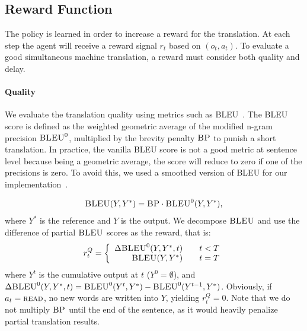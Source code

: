 

\subsection{Reward Function}
\label{sec:reward}

The policy is learned in order to increase a reward for the translation. At each step the agent will receive a reward signal $r_t$ based on $(o_t, a_t)$. To evaluate a good simultaneous machine translation, a reward must consider both quality and delay. 

\paragraph{Quality} We evaluate the translation quality using metrics such as BLEU~\cite{papineni2002bleu}. The BLEU score is defined as the weighted geometric average of the modified n-gram precision $\textsc{BLEU}^0$, multiplied by the brevity penalty $\textsc{BP}$ to punish a short translation. In practice, the vanilla BLEU score is not a good metric at sentence level because being a geometric average, the score will reduce to zero if one of the precisions is zero. To avoid this, we used a smoothed version of BLEU for our implementation~\cite{lin2004automatic}.

\begin{equation}
    \textsc{BLEU}(Y, Y^*) = \textsc{BP} \cdot \textsc{BLEU}^0(Y, Y^*),
\end{equation}
where $Y^*$ is the reference and $Y$ is the output.  
We decompose $\textsc{BLEU}$ and use the difference of partial $\textsc{BLEU}$ scores as the reward, that is:
\begin{equation}
    r_t^Q=\left\{
\begin{array}{rcl}
\Delta\textsc{BLEU}^0(Y, Y^*, t)     &      & {t < T}\\
\textsc{BLEU}(Y, Y^*)    &      & {t = T}
\end{array} \right. 
\end{equation}
where $Y^t$ is the cumulative output at $t$ ($Y^0=\emptyset$), and $\Delta\textsc{BLEU}^0(Y, Y^*, t) = \textsc{BLEU}^0(Y^t, Y^*) - \textsc{BLEU}^0(Y^{t-1}, Y^*)$. Obviously, if $a_t=\textsc{read}$, no new words are written into $Y$, yielding $r_t^Q=0$. Note that we do not multiply $\textsc{BP}$
until the end of the sentence, as it would heavily penalize partial translation results.

